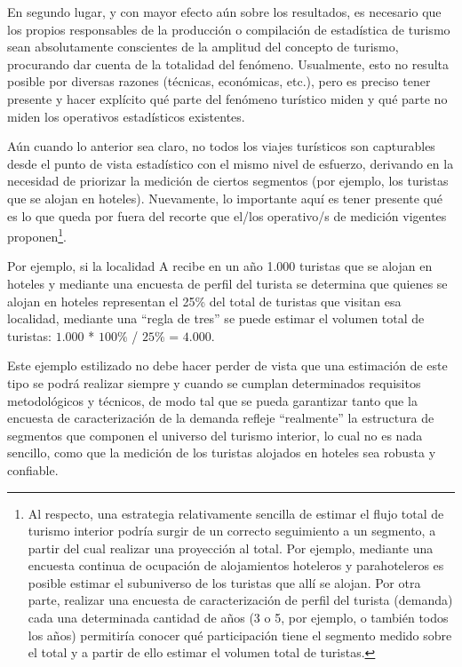 \documentclass[
]{book}
\begin{document}
En segundo lugar, y con mayor efecto aún sobre los resultados, es necesario que los propios responsables de la producción o compilación de estadística de turismo sean absolutamente conscientes de la amplitud del concepto de turismo, procurando dar cuenta de la totalidad del fenómeno. Usualmente, esto no resulta posible por diversas razones (técnicas, económicas, etc.), pero es preciso tener presente y hacer explícito qué parte del fenómeno turístico miden y qué parte no miden los operativos estadísticos existentes.

Aún cuando lo anterior sea claro, no todos los viajes turísticos son capturables desde el punto de vista estadístico con el mismo nivel de esfuerzo, derivando en la necesidad de priorizar la medición de ciertos segmentos (por ejemplo, los turistas que se alojan en hoteles). Nuevamente, lo importante aquí es tener presente qué es lo que queda por fuera del recorte que el/los operativo/s de medición vigentes proponen\footnote{Al respecto, una estrategia relativamente sencilla de estimar el flujo total de turismo interior podría surgir de un correcto seguimiento a un segmento, a partir del cual realizar una proyección al total. Por ejemplo, mediante una encuesta continua de ocupación de alojamientos hoteleros y parahoteleros es posible estimar el subuniverso de los turistas que allí se alojan. Por otra parte, realizar una encuesta de caracterización de perfil del turista (demanda) cada una determinada cantidad de años (3 o 5, por ejemplo, o también todos los años) permitiría conocer qué participación tiene el segmento medido sobre el total y a partir de ello estimar el volumen total de turistas.}.

Por ejemplo, si la localidad A recibe en un año 1.000 turistas que se alojan en hoteles y mediante una encuesta de perfil del turista se determina que quienes se alojan en hoteles representan el 25\% del total de turistas que visitan esa localidad, mediante una ``regla de tres'' se puede estimar el volumen total de turistas: \(1.000\) * \(100\%\) / \(25\%\) = \(4.000\).

Este ejemplo estilizado no debe hacer perder de vista que una estimación de este tipo se podrá realizar siempre y cuando se cumplan determinados requisitos metodológicos y técnicos, de modo tal que se pueda garantizar tanto que la encuesta de caracterización de la demanda refleje ``realmente'' la estructura de segmentos que componen el universo del turismo interior, lo cual no es nada sencillo, como que la medición de los turistas alojados en hoteles sea robusta y confiable.
\end{document}
